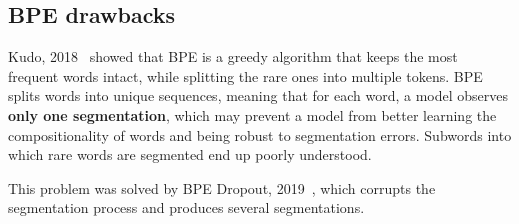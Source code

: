 \subsection{BPE drawbacks}

Kudo, 2018~\cite{kudo-2018-subword} showed that BPE is a greedy algorithm that keeps the most frequent words intact, while splitting the rare ones into multiple tokens. BPE splits words into unique sequences, meaning that for each word, a model observes \textbf{only one segmentation}, which may prevent a model from better learning the compositionality of words and being robust to segmentation errors. Subwords into which rare words are segmented end up poorly understood.

This problem was solved by BPE Dropout, 2019~\cite{provilkov2019bpedropout}, which corrupts the segmentation process and produces several segmentations.
